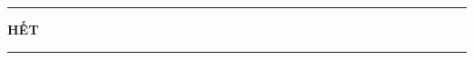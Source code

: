 \fileend


\begin{center}
	\rule[4pt]{2cm}{1pt}\large \textbf{HẾT}\rule[4pt]{2cm}{1pt}
\end{center}











